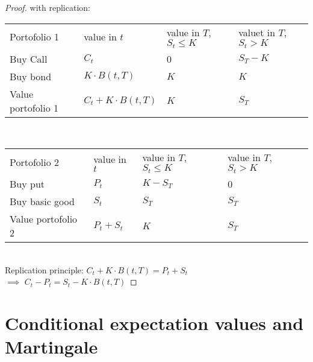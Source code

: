 \begin{proof} %
	with replication:\\
	\begin{tabular}{l|l|l|l} %
		Portofolio 1 & value in $t$ & value in $T$, $S_t \le K$ & valuet in $T$, $S_t > K$\\
		Buy Call & $C_t$ & 0 & $S_T - K$\\
		Buy bond & $K \cdot B(t,T)$ & $K$ & $K$\\
		Value portofolio 1 & $C_t + K\cdot B(t,T)$ & $K$ & $S_T$\\
	\end{tabular}\\
	\newline
	\begin{tabular}{l|l|l|l} %
		Portofolio 2 & value in $t$ & value in $T$, $S_t \le K$ & value in $T$, $S_t > K$\\
		Buy put & $P_t$ & $K-S_T$ & 0\\
		Buy basic good & $S_t$ & $S_T$ & $S_T$\\
		Value portofolio 2 & $P_t + S_t$ & $K$ & $S_T$\\
	\end{tabular}\\
	Replication principle: $C_t + K\cdot B(t,T) = P_t + S_t$\\
	$\implies$ $C_t - P_t = S_t - K\cdot B(t,T)$
\end{proof} %
\section{Conditional expectation values and Martingale} %
